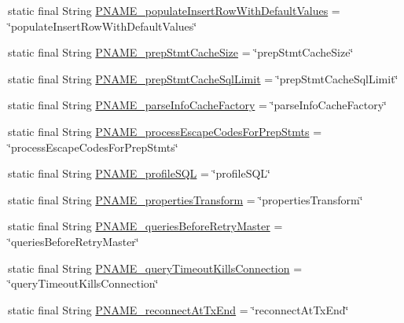 \begin{DoxyCompactItemize}
\item 
static final String \mbox{\hyperlink{classcom_1_1mysql_1_1cj_1_1conf_1_1_property_definitions_a63bd5be16794a50102559fef49335d3f}{P\+N\+A\+M\+E\+\_\+populate\+Insert\+Row\+With\+Default\+Values}} = \char`\"{}populate\+Insert\+Row\+With\+Default\+Values\char`\"{}
\item 
static final String \mbox{\hyperlink{classcom_1_1mysql_1_1cj_1_1conf_1_1_property_definitions_ae5ec822a1f02663ce50bda8566ab4679}{P\+N\+A\+M\+E\+\_\+prep\+Stmt\+Cache\+Size}} = \char`\"{}prep\+Stmt\+Cache\+Size\char`\"{}
\item 
static final String \mbox{\hyperlink{classcom_1_1mysql_1_1cj_1_1conf_1_1_property_definitions_af893879da8fef114dde75454023e5eb2}{P\+N\+A\+M\+E\+\_\+prep\+Stmt\+Cache\+Sql\+Limit}} = \char`\"{}prep\+Stmt\+Cache\+Sql\+Limit\char`\"{}
\item 
static final String \mbox{\hyperlink{classcom_1_1mysql_1_1cj_1_1conf_1_1_property_definitions_ab859c14699bf98d6f14f09c81cd1c282}{P\+N\+A\+M\+E\+\_\+parse\+Info\+Cache\+Factory}} = \char`\"{}parse\+Info\+Cache\+Factory\char`\"{}
\item 
static final String \mbox{\hyperlink{classcom_1_1mysql_1_1cj_1_1conf_1_1_property_definitions_ad7dcd48ae55f4a295c4641f37db48236}{P\+N\+A\+M\+E\+\_\+process\+Escape\+Codes\+For\+Prep\+Stmts}} = \char`\"{}process\+Escape\+Codes\+For\+Prep\+Stmts\char`\"{}
\item 
static final String \mbox{\hyperlink{classcom_1_1mysql_1_1cj_1_1conf_1_1_property_definitions_a35851c60e098a835ede4ce332cb36d2b}{P\+N\+A\+M\+E\+\_\+profile\+S\+QL}} = \char`\"{}profile\+S\+QL\char`\"{}
\item 
static final String \mbox{\hyperlink{classcom_1_1mysql_1_1cj_1_1conf_1_1_property_definitions_a15f1ee4405755ed2f824c95fa87406be}{P\+N\+A\+M\+E\+\_\+properties\+Transform}} = \char`\"{}properties\+Transform\char`\"{}
\item 
static final String \mbox{\hyperlink{classcom_1_1mysql_1_1cj_1_1conf_1_1_property_definitions_a0a08f48d1a3a65202c8f59e089475486}{P\+N\+A\+M\+E\+\_\+queries\+Before\+Retry\+Master}} = \char`\"{}queries\+Before\+Retry\+Master\char`\"{}
\item 
static final String \mbox{\hyperlink{classcom_1_1mysql_1_1cj_1_1conf_1_1_property_definitions_ab23780e35d07d7bc2f41f51cb345f5f1}{P\+N\+A\+M\+E\+\_\+query\+Timeout\+Kills\+Connection}} = \char`\"{}query\+Timeout\+Kills\+Connection\char`\"{}
\item 
static final String \mbox{\hyperlink{classcom_1_1mysql_1_1cj_1_1conf_1_1_property_definitions_a3f58fa4e79623dd24e21a68c8849facf}{P\+N\+A\+M\+E\+\_\+reconnect\+At\+Tx\+End}} = \char`\"{}reconnect\+At\+Tx\+End\char`\"{}

\end{DoxyCompactItemize}
